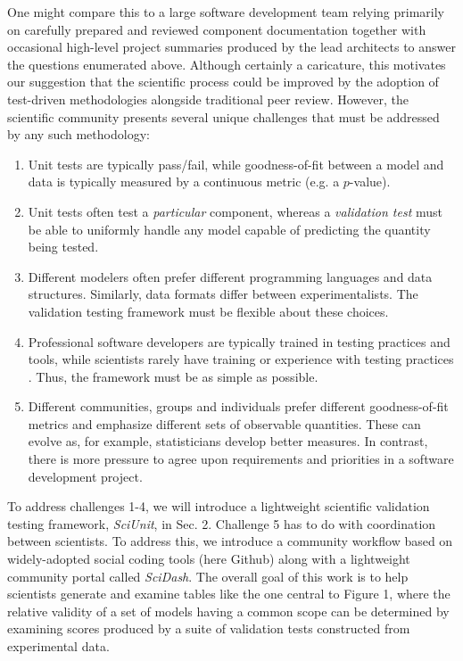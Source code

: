 \documentclass[9pt]{sig-alternate}
\begin{document}
One might compare this to a large software development team relying primarily on carefully prepared and reviewed component documentation together with occasional high-level project summaries produced by the lead architects to answer the questions enumerated above.
Although certainly a caricature, this motivates our suggestion that the scientific process could be improved by the adoption of test-driven methodologies alongside traditional peer review. However, the scientific community presents several unique challenges that must be addressed by any such methodology:
\begin{enumerate}
\item Unit tests are typically pass/fail, while goodness-of-fit between a model and data is typically measured by a continuous metric (e.g. a $p$-value). 
\item Unit tests often test a \emph{particular} component, whereas a \emph{validation test} must be able to uniformly handle any model capable of predicting the quantity being tested. %
\item Different modelers often  prefer different programming languages and data structures. Similarly, data formats differ between experimentalists. The validation  testing framework must be flexible about these choices.
\item Professional software developers are typically trained in testing practices and tools, while scientists  rarely have training or experience with testing practices \cite{oai:open.ac.uk.OAI2:17673}. Thus, the framework must be as simple as possible.
\item Different communities, groups and individuals prefer different goodness-of-fit metrics and emphasize different sets of observable quantities. These can evolve as, for example, statisticians develop better measures. In contrast, there is more pressure to agree upon requirements and priorities in a software development project.
\end{enumerate}

To address challenges 1-4, we will introduce a lightweight scientific validation testing framework, \textit{SciUnit}, in Sec. 2. Challenge 5 has to do with coordination between scientists. To address this, we introduce a community workflow based on widely-adopted social coding tools (here Github) along with a lightweight community portal called \textit{SciDash}. The overall goal of this work is to help scientists generate and examine tables like the one central to Figure 1, where the relative validity of a set of models having a common scope can be determined by examining scores produced by a suite of validation tests constructed from experimental data. 
\end{document}
